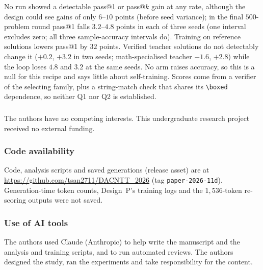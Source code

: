 \documentclass[runningheads]{llncs}
\begin{document}
No run showed a detectable pass@1 or pass@$k$ gain at any rate, although the design could see gains of only $6$--$10$ points (before seed variance); in the final $500$-problem round pass@1 falls $3.2$--$4.8$ points in each of three seeds (one interval excludes zero; all three sample-accuracy intervals do). Training on reference solutions lowers pass@1 by $32$ points. Verified teacher solutions do not detectably change it ($+0.2$, $+3.2$ in two seeds; math-specialised teacher $-1.6$, $+2.8$) while the loop loses $4.8$ and $3.2$ at the same seeds. No arm raises accuracy, so this is a null for this recipe and says little about self-training. Scores come from a verifier of the selecting family, plus a string-match check that shares its \verb|\boxed| dependence, so neither Q1 nor Q2 is established.


\begin{credits}
\subsubsection{\discintname}
The authors have no competing interests. This undergraduate research project
received no external funding.

\subsubsection{Code availability}
Code, analysis scripts and saved generations (release asset) are at
\url{https://github.com/tsan2711/DACNTT_2026} (tag \texttt{paper-2026-11d}). Generation-time token counts, Design~P's training logs and the
$1{,}536$-token re-scoring outputs were not saved.

\subsubsection{Use of AI tools}
The authors used Claude (Anthropic) to help write the manuscript and the analysis
and training scripts, and to run automated reviews. The authors designed the study, ran the experiments
and take responsibility for the content.
\end{credits}
\end{document}
